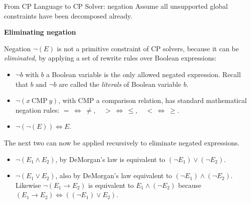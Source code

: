 \documentclass{cons-beamer}
\begin{document}
\begin{frame}{From CP Language to CP Solver: negation}
	Assume all unsupported global constraints have been decomposed already.
	
	\textbf{Eliminating negation}
	
	Negation $\neg (E)$ is not a primitive constraint of CP solvers, because it can be \textit{eliminated}, by applying a set of rewrite rules over Boolean expressions:
	
	\begin{itemize}
		\item $\neg b$ \quad with $b$ a Boolean variable is the only allowed negated expression. Recall that $b$ and $\neg b$ are called the \textit{literals} of Boolean variable $b$.
		\item $\neg (x ~\text{CMP}~ y)$, \quad with CMP a comparison relation, has standard mathematical negation rules: $= ~\Leftrightarrow~ \neq,\quad > ~\Leftrightarrow~ \leq,\quad < ~\Leftrightarrow~ \geq$.
		\item $\neg (\neg (E)) \Leftrightarrow E$.
	\end{itemize}
	\pause
	\vfill
	
	The next two can now be applied recursively to eliminate negated expressions.
	\begin{itemize}
		\item $\neg (E_1 \land E_2)$, \quad by DeMorgan's law is equivalent to $(\neg E_1) \lor (\neg E_2)$.
		\item $\neg (E_1 \lor E_2)$, \quad also by DeMorgan's law equivalent to $(\neg E_1) \land (\neg E_2)$. Likewise $\neg (E_1 \rightarrow E_2)$ is equivalent to $E_1 \land (\neg E_2)$ because $(E_1 \rightarrow E_2) \Leftrightarrow ((\neg E_1) \lor E_2)$.
	\end{itemize}
	
\end{frame}
\end{document}
